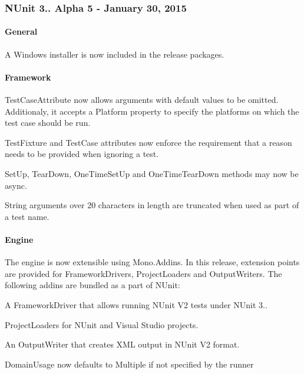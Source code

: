\subsubsection*{N\+Unit 3.. Alpha 5 -\/ January 30, 2015}

\paragraph*{General}


\begin{DoxyItemize}
\item A Windows installer is now included in the release packages.
\end{DoxyItemize}

\paragraph*{Framework}


\begin{DoxyItemize}
\item Test\+Case\+Attribute now allows arguments with default values to be omitted. Additionaly, it accepts a Platform property to specify the platforms on which the test case should be run.
\item Test\+Fixture and Test\+Case attributes now enforce the requirement that a reason needs to be provided when ignoring a test.
\item Set\+Up, Tear\+Down, One\+Time\+Set\+Up and One\+Time\+Tear\+Down methods may now be async.
\item String arguments over 20 characters in length are truncated when used as part of a test name.
\end{DoxyItemize}

\paragraph*{Engine}


\begin{DoxyItemize}
\item The engine is now extensible using Mono.\+Addins. In this release, extension points are provided for Framework\+Drivers, Project\+Loaders and Output\+Writers. The following addins are bundled as a part of N\+Unit\+:
\begin{DoxyItemize}
\item A Framework\+Driver that allows running N\+Unit V2 tests under N\+Unit 3..
\item Project\+Loaders for N\+Unit and Visual Studio projects.
\item An Output\+Writer that creates X\+ML output in N\+Unit V2 format.
\end{DoxyItemize}
\item Domain\+Usage now defaults to Multiple if not specified by the runner
\end{DoxyItemize}

